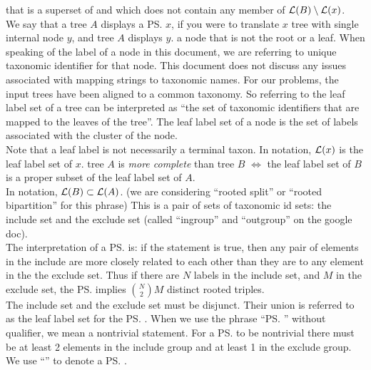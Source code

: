 \begin{compactenum}
    that is a superset of  and which does not contain any member of $\mathcal{L}(B) \setminus \mathcal{L}(x)$.\\
    We say that a tree $A$ displays a \ps $x$, if you were to translate
        $x$ tree with single internal node $y$, and tree $A$ displays $y$.
 a node that is not the root or a leaf.
 When speaking of the label of a node in this document, we are referring to unique taxonomic
    identifier for that node.
    This document does not discuss any issues associated with mapping strings to taxonomic names.
 For our problems, the input trees have been aligned to a common
    taxonomy. 
    So referring to the leaf label set of a tree can be interpreted as
    ``the set of taxonomic identifiers that are mapped to the leaves of the tree''.
    The leaf label set of a node is the set of labels associated with the cluster of the node.\\
    Note that a leaf label is not necessarily a terminal taxon.
    In notation, $\mathcal{L}(x)$ is the leaf label set of $x$.
 tree $A$ is {\em more complete} than tree $B$ $\iff$ the leaf
    label set of $B$ is a proper subset of the leaf label set of $A$. \\
    In notation, $\mathcal{L}(B) \subset \mathcal{L}(A)$.
 (we are considering ``rooted split'' or ``rooted bipartition'' for this phrase)
    This is a pair of sets of taxonomic id sets: the include set and the exclude set (called ``ingroup'' and ``outgroup''
    on the google doc).\\
    The interpretation of a \ps is: if the statement is true, then 
    any pair of elements in the include are more closely related to each
        other than they are to any element in the the exclude set.
    Thus if there are $N$ labels in the include set, and $M$ in the exclude set, the \ps implies
    ${N \choose 2}M$ distinct rooted triples.\\
    The include set and the exclude set must be disjunct. Their union is referred to as the leaf label set
        for the \ps.
    When we use the phrase ``\ps'' without qualifier, we mean a nontrivial statement.
    For a \ps to be nontrivial there must be at least 2 elements in the include group and at least 
        1 in the exclude group.\\
    We use ``'' to denote a \ps. 

\end{compactenum}
